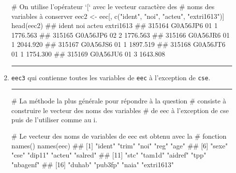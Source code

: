 \documentclass[12pt,twosided, notitlepage]{book}
\newenvironment{Shaded}{}{}
\newcommand{\KeywordTok}[1]{\textcolor[rgb]{0.00,0.00,1.00}{{#1}}}
\newcommand{\StringTok}[1]{\textcolor[rgb]{0.00,0.50,0.50}{{#1}}}
\newcommand{\CommentTok}[1]{\textcolor[rgb]{0.00,0.50,0.00}{{#1}}}
\newcommand{\NormalTok}[1]{{#1}}
\newif \ifsol
\renewenvironment{Shaded}{\begin{snugshade}}{\end{snugshade}}
\begin{document}
\begin{enumerate}
\begin{enumerate}
\begin{Shaded}
\begin{Highlighting}[]
\CommentTok{# On utilise l'opérateur `[` avec le vecteur caractère des}
\CommentTok{# noms des variables à conserver}
\NormalTok{eec2 <-}\StringTok{ }\NormalTok{eec[, }\KeywordTok{c}\NormalTok{(}\StringTok{"ident"}\NormalTok{, }\StringTok{"noi"}\NormalTok{, }\StringTok{"acteu"}\NormalTok{, }\StringTok{"extri1613"}\NormalTok{)]}
\KeywordTok{head}\NormalTok{(eec2)}
  \NormalTok{##           ident noi acteu extri1613}
  \NormalTok{## 315164 G0A56JP6  01     1  1776.563}
  \NormalTok{## 315165 G0A56JP6  02     2  1776.563}
  \NormalTok{## 315166 G0A56JR6  01     1  2044.920}
  \NormalTok{## 315167 G0A56JS6  01     1  1897.519}
  \NormalTok{## 315168 G0A56JT6  01     1  1754.300}
  \NormalTok{## 315169 G0A56JU6  01     3  1643.808}
\end{Highlighting}
\end{Shaded}

    \begin{center} \rule{0.5\linewidth}{\linethickness}\end{center}

    \bigskip  \fi 
  \item
    \texttt{eec3} qui contienne toutes les variables de \texttt{eec} à
    l'exception de \texttt{cse}.

    \ifsol  \textbf{Indication} Comment créeriez-vous le vecteur des
    noms des variables de la table \texttt{eec} à l'exception de
    \texttt{cse} ? Utilisez-le comme au i. pour sélectionner toutes les
    variables sauf \texttt{cse}.\fi 

    \ifsol 

    \begin{center} \rule{0.5\linewidth}{\linethickness}\end{center}

\begin{Shaded}
\begin{Highlighting}[]
\CommentTok{# La méthode la plus générale pour répondre à la question}
\CommentTok{# consiste à construire le vecteur des noms des variables}
\CommentTok{# de eec à l'exception de cse puis de l'utiliser comme au i. }

\CommentTok{# Le vecteur des noms de variables de eec est obtenu avec la}
\CommentTok{# fonction names()}
\KeywordTok{names}\NormalTok{(eec)}
  \NormalTok{##  [1] "ident"     "trim"      "noi"       "reg"       "age"      }
  \NormalTok{##  [6] "sexe"      "cse"       "dip11"     "acteu"     "salred"   }
  \NormalTok{## [11] "stc"       "tam1d"     "aidref"    "tpp"       "nbagenf"  }
  \NormalTok{## [16] "duhab"     "pub3fp"    "naia"      "extri1613"}


\end{Highlighting}
\end{Shaded}
\end{enumerate}
\end{enumerate}
\end{document}

